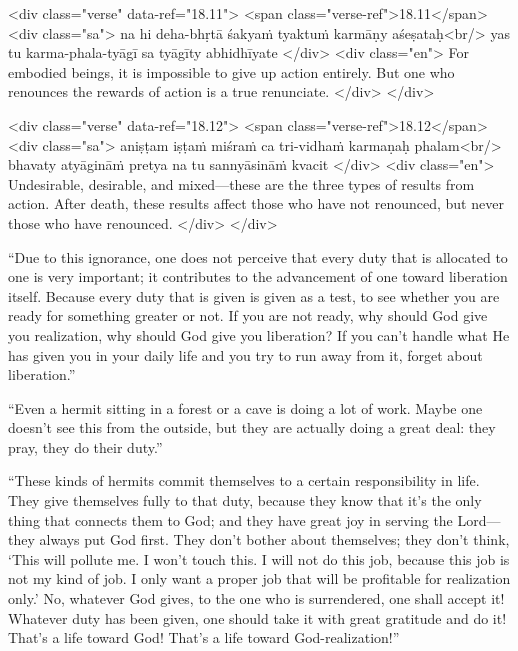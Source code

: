 \begin{html}
<div class="verse" data-ref="18.11">
  <span class="verse-ref">18.11</span>
  <div class="sa">
    na hi deha-bhṛtā śakyaṁ tyaktuṁ karmāṇy aśeṣataḥ<br/>
    yas tu karma-phala-tyāgī sa tyāgīty abhidhīyate
  </div>
  <div class="en">
    For embodied beings, it is impossible to give up action entirely. But one who renounces the rewards of action is a true renunciate.
  </div>
</div>
\end{html}



\begin{html}
<div class="verse" data-ref="18.12">
  <span class="verse-ref">18.12</span>
  <div class="sa">
    aniṣṭam iṣṭaṁ miśraṁ ca tri-vidhaṁ karmaṇaḥ phalam<br/>
    bhavaty atyāgināṁ pretya na tu sannyāsināṁ kvacit
  </div>
  <div class="en">
    Undesirable, desirable, and mixed---these are the three types of results from action. After death, these results affect those who have not renounced, but never those who have renounced.
  </div>
</div>
\end{html}


\enquote{Due to this ignorance, one does not perceive that every duty that is allocated to one is very important; it contributes to the advancement of one toward liberation itself. Because every duty that is given is given as a test, to see whether you are ready for something greater or not. If you are not ready, why should God give you realization, why should God give you liberation? If you can’t handle what He has given you in your daily life and you try to run away from it, forget about liberation.}

\enquote{Even a hermit sitting in a forest or a cave is doing a lot of work. Maybe one doesn’t see this from the outside, but they are actually doing a great deal: they pray, they do their duty.}

\enquote{These kinds of hermits commit themselves to a certain responsibility in life. They give themselves fully to that duty, because they know that it’s the only thing that connects them to God; and they have great joy in serving the Lord---they always put God first. They don’t bother about themselves; they don’t think, \enquote{This will pollute me. I won’t touch this. I will not do this job, because this job is not my kind of job. I only want a proper job that will be profitable for realization only.} No, whatever God gives, to the one who is surrendered, one shall accept it! Whatever duty has been given, one should take it with great gratitude and do it! That’s a life toward God! That’s a life toward God-realization!}

